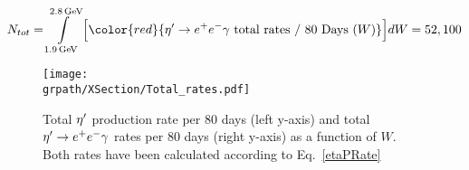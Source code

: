 \begin{equation}
  N_{tot} = \int\limits_{1.9\,\rm{GeV}}^{2.8\,\rm{GeV}} \Big[ {\color{red}{\etaP\rightarrow\epem\gamma\text{ total rates / 80 Days }(W)}} \Big]dW = 52,100
\label{yield}
\end{equation}


\begin{figure}[h!]\begin{center}
		\texttt{[image: \\grpath/XSection/Total\_rates.pdf]}\\
		\caption[etaP rates]{\label{fig:EtaPRate}{Total $\eta^{\prime}$ production rate per 80 days (left y-axis) and total $\eta^{\prime}\rightarrow e^+e^-\gamma$ rates per 80 days (right y-axis) as a function of $W$. Both rates have been calculated according to Eq.~\ref{etaPRate}}}
\end{center}\end{figure}







